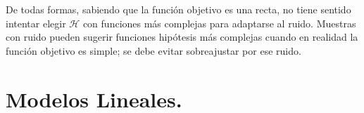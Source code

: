\documentclass[11pt,a4paper]{article}
\theoremstyle{definition}
\begin{document}
	De todas formas, sabiendo que la función objetivo es una recta, no tiene sentido intentar elegir $\mathcal{H}$ con funciones más complejas para adaptarse al ruido. Muestras con ruido pueden sugerir funciones hipótesis más complejas cuando en realidad la función objetivo es simple; se debe evitar sobreajustar por ese ruido.
	
	
	%
    \newpage
    \section{Modelos Lineales.}
\end{document}
